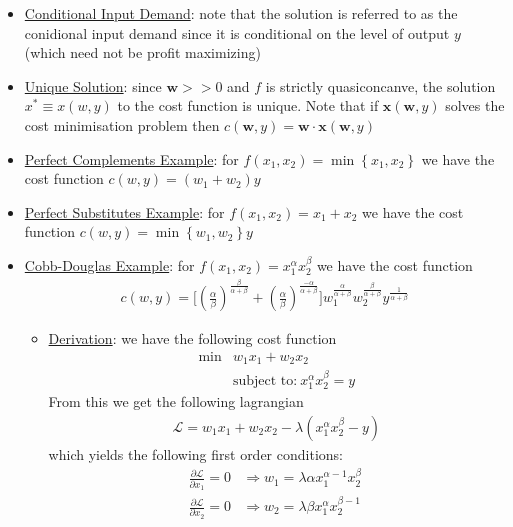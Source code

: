 \documentclass{article}
\begin{document}
  \begin{itemize}
    \item  \underline{Conditional Input Demand}: note that the solution is referred to as the conidional input demand since it is conditional on the level of output $y$ (which need not be profit maximizing)
    \item  \underline{Unique Solution}: since $\mathbf{w} >> 0$ and $f$ is strictly quasiconcanve, the solution $x^{*} \equiv x(w,y)$ to the cost function is unique. Note that if $\mathbf{x}(\mathbf{w},y)$ solves the cost minimisation problem then $c(\mathbf{w}, y) = \mathbf{w} \cdot \mathbf{x}(\mathbf{w},y)$
    \item  \underline{Perfect Complements Example}: for $f(x_{1}, x_{2}) = \min \left\{ x_{1}, x_{2} \right\}$ we have the cost function $c(w,y) = (w_{1} + w_{2})y$
    \item  \underline{Perfect Substitutes Example}: for $f(x_{1}, x_{2}) = x_{1} + x_{2}$ we have the cost function $c(w,y) = \min \left\{ w_{1}, w_{2} \right\} y$
    \item  \underline{Cobb-Douglas Example}: for $f(x_{1}, x_{2}) = x_{1}^{\alpha}x_{2}^{\beta}$ we have the cost function
    \begin{gather*}
      c(w,y) = \big[ (\frac{\alpha}{\beta})^{\tfrac{\beta}{\alpha + \beta}} + (\frac{\alpha}{\beta})^{\tfrac{- \alpha}{\alpha + \beta}} \big] w_{1}^{\tfrac{\alpha}{\alpha + \beta}} w_{2}^{\tfrac{\beta}{\alpha + \beta}} y^{\tfrac{1}{\alpha + \beta}}
    \end{gather*}
    \begin{itemize}
      \item  \underline{Derivation}: we have the following cost function
      \begin{align*}
        \min &w_{1}x_{1} + w_{2}x_{2} \\
        &\text{subject to:} \ x_{1}^{\alpha}x_{2}^{\beta} = y
      \end{align*}
      From this we get the following lagrangian
      \begin{gather*}
        \mathcal{L} = w_{1}x_{1} + w_{2}x_{2} - \lambda (x_{1}^{\alpha}x_{2}^{\beta} - y)
      \end{gather*}
      which yields the following first order conditions:
      \begin{align*}
        \frac{\partial \mathcal{L}}{\partial x_{1}} = 0 &\Rightarrow w_{1} = \lambda \alpha x_{1}^{\alpha -1}x_{2}^{\beta} \ \tag{1} \\
        \frac{\partial \mathcal{L}}{\partial x_{2}} = 0 &\Rightarrow w_{2} = \lambda \beta x_{1}^{\alpha}x_{2}^{\beta-1} \ \tag{2} \\

\end{align*}
\end{itemize}
\end{itemize}
\end{document}
